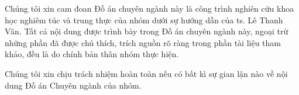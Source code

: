
Chúng tôi xin cam đoan Đồ án chuyên ngành này là công trình nghiên cứu khoa học nghiêm túc và trung thực của nhóm dưới sự hướng dẫn của \acrshort{ts}. Lê Thanh Vân. Tất cả nội dung được trình bày trong Đồ án chuyên ngành này, ngoại trừ những phần đã được chú thích, trích nguồn rõ ràng trong phần tài liệu tham khảo, đều là do chính bản thân nhóm thực hiện.

\indent Chúng tôi xin chịu trách nhiệm hoàn toàn nếu có bất kì sự gian lận nào về nội dung Đồ án Chuyên ngành của nhóm.